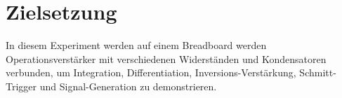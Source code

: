 \section{Zielsetzung}
\label{sec:Zielsetzung}

In diesem Experiment werden auf einem Breadboard werden Operationsverstärker mit verschiedenen Widerständen und Kondensatoren
verbunden, um Integration, Differentiation, Inversions-Verstärkung, Schmitt-Trigger und Signal-Generation zu demonstrieren.